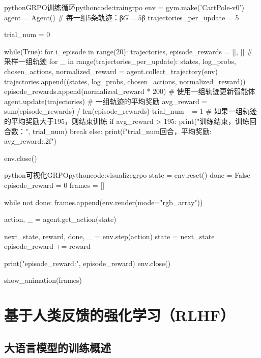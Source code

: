 \documentclass[lang=cn,newtx,10pt,scheme=chinese]{elegantbook}
\begin{document}
\begin{codebox}{python}{GRPO训练循环}{pythoncode:traingrpo}
env = gym.make('CartPole-v0')
agent = Agent()
# 每一组5条轨迹：β$G=5$β
trajectories_per_update = 5

trial_num = 0

while(True):
    for i_episode in range(20):
        trajectories, episode_rewards = [], []
        # 采样一组轨迹
        for _ in range(trajectories_per_update):
            states, log_probs, chosen_actions, normalized_reward = agent.collect_trajectory(env)
            trajectories.append((states, log_probs, chosen_actions, normalized_reward))
            episode_rewards.append(normalized_reward * 200)
        # 使用一组轨迹更新智能体
        agent.update(trajectories)
    # 一组轨迹的平均奖励
    avg_reward = sum(episode_rewards) / len(episode_rewards)
    trial_num += 1
    # 如果一组轨迹的平均奖励大于195，则结束训练
    if avg_reward > 195:
        print("训练结束，训练回合数：", trial_num)
        break
    else:
        print(f"{trial_num}回合，平均奖励: {avg_reward:.2f}")

env.close()
\end{codebox}

\begin{codebox}{python}{可视化GRPO}{pythoncode:visualizegrpo}
state = env.reset()
done = False
episode_reward = 0
frames = []

while not done:
    frames.append(env.render(mode="rgb_array"))

    action, _ = agent.get_action(state)

    next_state, reward, done, _ = env.step(action)
    state = next_state
    episode_reward += reward

print("episode_reward:", episode_reward)
env.close()

show_animation(frames)
\end{codebox}

\part{基于人类反馈的强化学习（RLHF）}

\chapter{大语言模型的训练概述}
\end{document}
